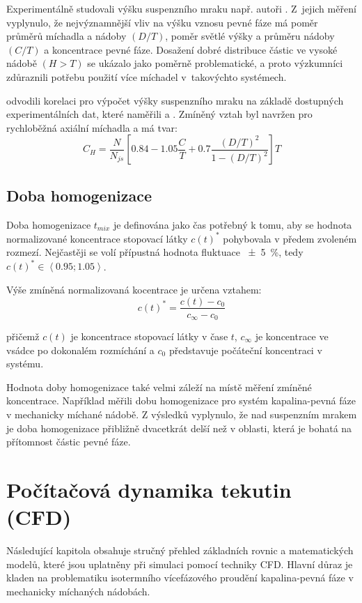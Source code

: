 Experimentálně studovali výšku suspenzního mraku např. autoři \citet{hic97}. Z~jejich měření vyplynulo, že nejvýznamnější vliv na výšku vznosu pevné fáze má poměr průměrů míchadla a nádoby $(D/T)$, poměr světlé výšky a průměru nádoby $(C/T)$ a koncentrace pevné fáze. Dosažení dobré distribuce částic ve vysoké nádobě $(H > T)$ se ukázalo jako poměrně problematické, a proto výzkumníci zdůraznili potřebu použití více míchadel v~takovýchto systémech.

\citet{bit02} odvodili korelaci pro výpočet výšky suspenzního mraku na základě dostupných experimentálních dat, které naměřili \citet{hic97} a \citet{buj99}. Zmíněný vztah byl navržen pro rychloběžná axiální míchadla a má tvar:
\begin{equation}
	C_{H}=\frac{N}{N_{js}}\left[\num{0.84} - \num{1.05}\frac{C}{T} + \num{0.7}\frac{(D/T)^{2}}{1 - (D/T)^{2}}  \right]T
	\label{eq:sushei}
\end{equation}  

\subsection{Doba homogenizace}
Doba homogenizace $t_{mix}$ je definována jako čas potřebný k tomu, aby se hodnota normalizované koncentrace stopovací látky $c(t)^{*}$ pohybovala v předem zvoleném rozmezí. Nejčastěji se volí přípustná hodnota fluktuace \SI{\pm 5}{\percent}, tedy $c(t)^{*} \in \left<\num{0.95};\num{1.05}\right>$. 

Výše zmíněná normalizovaná kocentrace je určena vztahem:
\begin{equation}
	c(t)^{*} = \frac{c(t) - c_{0}}{c_{\infty} - c_{0}}
	\label{eq:bezkon}
\end{equation}

\noindent přičemž $c(t)$ je koncentrace stopovací látky v čase $t$, $c_{\infty}$ je koncentrace ve vsádce po dokonalém rozmíchání a $c_{0}$ představuje počáteční koncentraci v systému.  

Hodnota doby homogenizace také velmi záleží na místě měření zmíněné koncentrace. Například \citet{buj99} měřili dobu homogenizace pro systém kapalina-pevná fáze v mechanicky míchané nádobě. Z výsledků vyplynulo, že nad suspenzním mrakem je doba homogenizace přibližně dvacetkrát delší než v oblasti, která je bohatá na přítomnost částic pevné fáze.

\section{Počítačová dynamika tekutin (CFD)}
Následující kapitola obsahuje stručný přehled základních rovnic a matematických modelů, které jsou uplatněny při simulaci pomocí techniky CFD. Hlavní důraz je kladen na problematiku isotermního vícefázového proudění kapalina-pevná fáze v mechanicky míchaných nádobách.

